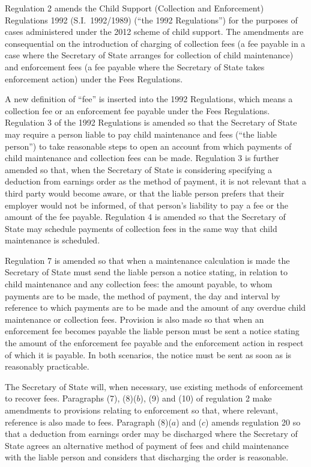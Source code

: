 \documentclass[12pt,a4paper]{article}
\begin{document}
Regulation 2 amends the Child Support (Collection and Enforcement) Regulations 1992 (S.I.~1992/1989) (“the 1992 Regulations”) for the purposes of cases administered under the 2012 scheme of child support. The amendments are consequential on the introduction of charging of collection fees (a fee payable in a case where the Secretary of State arranges for collection of child maintenance) and enforcement fees (a fee payable where the Secretary of State takes enforcement action) under the Fees Regulations.

A new definition of “fee” is inserted into the 1992 Regulations, which means a collection fee or an enforcement fee payable under the Fees Regulations. Regulation 3 of the 1992 Regulations is amended so that the Secretary of State may require a person liable to pay child maintenance and fees (“the liable person”) to take reasonable steps to open an account from which payments of child maintenance and collection fees can be made. Regulation 3 is further amended so that, when the Secretary of State is considering specifying a deduction from earnings order as the method of payment, it is not relevant that a third party would become aware, or that the liable person prefers that their employer would not be informed, of that person’s liability to pay a fee or the amount of the fee payable. Regulation 4 is amended so that the Secretary of State may schedule payments of collection fees in the same way that child maintenance is scheduled.

Regulation 7 is amended so that when a maintenance calculation is made the Secretary of State must send the liable person a notice stating, in relation to child maintenance and any collection fees: the amount payable, to whom payments are to be made, the method of payment, the day and interval by reference to which payments are to be made and the amount of any overdue child maintenance or collection fees. Provision is also made so that when an enforcement fee becomes payable the liable person must be sent a notice stating the amount of the enforcement fee payable and the enforcement action in respect of which it is payable. In both scenarios, the notice must be sent as soon as is reasonably practicable.

The Secretary of State will, when necessary, use existing methods of enforcement to recover fees. Paragraphs (7), (8)($b$), (9) and (10) of regulation 2 make amendments to provisions relating to enforcement so that, where relevant, reference is also made to fees. Paragraph (8)($a$)  and ($c$)  amends regulation 20 so that a deduction from earnings order may be discharged where the Secretary of State agrees an alternative method of payment of fees and child maintenance with the liable person and considers that discharging the order is reasonable.
\end{document}
